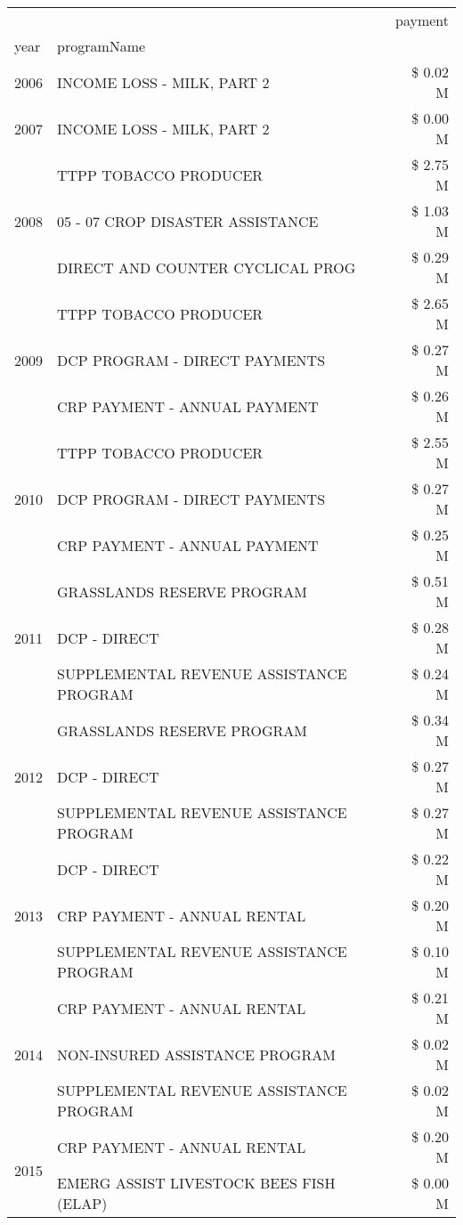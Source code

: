 \begin{tabular}{llr}
\toprule
 &  & payment \\
year & programName &  \\
\midrule
2006 & INCOME LOSS - MILK, PART 2 & \$ 0.02 M \\
\cline{1-3}
2007 & INCOME LOSS - MILK, PART 2 & \$ 0.00 M \\
\cline{1-3}
\multirow[t]{3}{*}{2008} & TTPP TOBACCO PRODUCER & \$ 2.75 M \\
 & 05 - 07 CROP DISASTER ASSISTANCE & \$ 1.03 M \\
 & DIRECT AND COUNTER CYCLICAL PROG & \$ 0.29 M \\
\cline{1-3}
\multirow[t]{3}{*}{2009} & TTPP TOBACCO PRODUCER & \$ 2.65 M \\
 & DCP PROGRAM - DIRECT PAYMENTS & \$ 0.27 M \\
 & CRP PAYMENT - ANNUAL PAYMENT & \$ 0.26 M \\
\cline{1-3}
\multirow[t]{3}{*}{2010} & TTPP TOBACCO PRODUCER & \$ 2.55 M \\
 & DCP PROGRAM - DIRECT PAYMENTS & \$ 0.27 M \\
 & CRP PAYMENT - ANNUAL PAYMENT & \$ 0.25 M \\
\cline{1-3}
\multirow[t]{3}{*}{2011} & GRASSLANDS RESERVE PROGRAM & \$ 0.51 M \\
 & DCP - DIRECT & \$ 0.28 M \\
 & SUPPLEMENTAL REVENUE ASSISTANCE PROGRAM & \$ 0.24 M \\
\cline{1-3}
\multirow[t]{3}{*}{2012} & GRASSLANDS RESERVE PROGRAM & \$ 0.34 M \\
 & DCP - DIRECT & \$ 0.27 M \\
 & SUPPLEMENTAL REVENUE ASSISTANCE PROGRAM & \$ 0.27 M \\
\cline{1-3}
\multirow[t]{3}{*}{2013} & DCP - DIRECT & \$ 0.22 M \\
 & CRP PAYMENT - ANNUAL RENTAL & \$ 0.20 M \\
 & SUPPLEMENTAL REVENUE ASSISTANCE PROGRAM & \$ 0.10 M \\
\cline{1-3}
\multirow[t]{3}{*}{2014} & CRP PAYMENT - ANNUAL RENTAL & \$ 0.21 M \\
 & NON-INSURED ASSISTANCE PROGRAM & \$ 0.02 M \\
 & SUPPLEMENTAL REVENUE ASSISTANCE PROGRAM & \$ 0.02 M \\
\cline{1-3}
\multirow[t]{3}{*}{2015} & CRP PAYMENT - ANNUAL RENTAL & \$ 0.20 M \\
 & EMERG ASSIST LIVESTOCK BEES FISH (ELAP) & \$ 0.00 M \\

\end{tabular}
